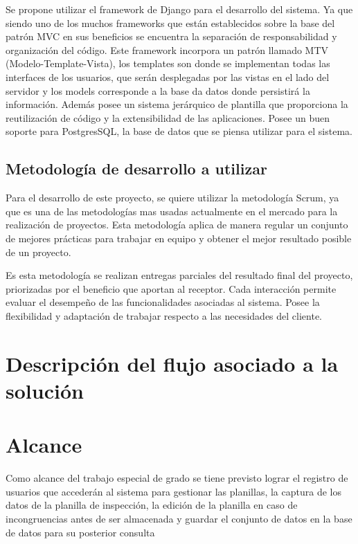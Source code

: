 Se propone utilizar el framework de Django para el desarrollo del sistema. Ya que siendo uno de los muchos frameworks que están establecidos sobre la base del patrón MVC en sus beneficios se encuentra la separación de responsabilidad y organización del código. Este framework incorpora un patrón llamado MTV (Modelo-Template-Vista), los templates son donde se implementan todas las interfaces de los usuarios, que serán desplegadas por las vistas en el lado del servidor y los models corresponde a la base da datos donde persistirá la información. Además posee un sistema jerárquico de plantilla que proporciona la reutilización de código y la extensibilidad de las aplicaciones. Posee un buen soporte para PostgresSQL, la base de datos que se piensa utilizar para el sistema. 

\setlength{\parskip}{0mm}


\newpage
\subsection{Metodología de desarrollo a utilizar}


\setlength{\parskip}{5mm}
Para el desarrollo de este proyecto, se quiere utilizar la metodología Scrum, ya que es una de las metodologías mas usadas actualmente en el mercado para la realización de proyectos. Esta metodología aplica de manera regular un conjunto de mejores prácticas para trabajar en equipo y obtener el mejor resultado posible de un proyecto.

Es esta metodología se realizan entregas parciales del resultado final del proyecto, priorizadas por el beneficio que aportan al receptor. Cada interacción permite evaluar el desempeño de las funcionalidades asociadas al sistema. Posee la flexibilidad y adaptación de trabajar respecto a las necesidades del cliente. 

\setlength{\parskip}{0mm}


\section{Descripción del flujo asociado a la solución}



\section{Alcance}

Como alcance del trabajo especial de grado se tiene previsto lograr el registro de usuarios que accederán al sistema para gestionar las planillas, la captura de los datos de la planilla de inspección, la edición de la planilla en caso de incongruencias antes de ser almacenada y guardar el conjunto de datos en la base de datos para su posterior consulta


